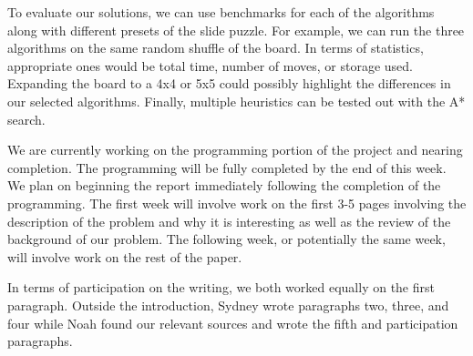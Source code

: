 \documentclass{article}
\begin{document}
To evaluate our solutions, we can use benchmarks for each of the algorithms along with different presets of the slide puzzle. For example, we can run the three algorithms on the same random shuffle of the board. In terms of statistics, appropriate ones would be total time, number of moves, or storage used. Expanding the board to a 4x4 or 5x5 could possibly highlight the differences in our selected algorithms. Finally, multiple heuristics can be tested out with the A* search.
\newline

We are currently working on the programming portion of the project and nearing completion. The programming will be fully completed by the end of this week. We plan on beginning the report immediately following the completion of the programming. The first week will involve work on the first 3-5 pages involving the description of the problem and why it is interesting as well as the review of the background of our problem. The following week, or potentially the same week, will involve work on the rest of the paper.
\newline

In terms of participation on the writing, we both worked equally on the first paragraph. Outside the introduction, Sydney wrote paragraphs two, three, and four while Noah found our relevant sources and wrote the fifth and participation paragraphs.



\end{document}
